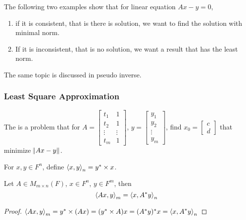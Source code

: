 The following two examples show that for linear equation $Ax - y = 0$, 
\begin{enumerate}
    \item if it is consistent, that is there is solution, we want to find the solution with minimal norm.
    \item If it is inconsistent, that is no solution, we want a result that has the least norm.
\end{enumerate}

The same topic is discussed in pseudo inverse.


\subsubsection{Least Square Approximation}

\begin{definition}
    The  is a problem that for $A = \begin{bmatrix}
        t_1 & 1 \\
        t_2 & 1 \\
        \vdots & \vdots \\
        t_m & 1
    \end{bmatrix}$,  $y = \begin{bmatrix}
        y_1\\
        y_2\\
        \vdots\\
        y_m
    \end{bmatrix}$, find $x_0 = \begin{bmatrix}
        c \\
        d
    \end{bmatrix}$ that minimize $\norm{Ax-y}$.
\end{definition}

\begin{definition}
    For $x,y \in F^n$, define $\innerproduct{x}{y}_n = y^* \times x$.
\end{definition}


\begin{theorem}
    Let $A \in M_{m \times n} (F)$, $x \in F^n$, $y\in F^m$, then
    \begin{equation}
        \innerproduct{Ax}{y}_m = \innerproduct{x}{A^* y}_n
    \end{equation}
\end{theorem}
\begin{proof}
    $\innerproduct{Ax}{y}_m = y^* \times (Ax) = (y^* \times A) x = (A^* y)^* x = \innerproduct{x}{A^* y}_n$
\end{proof}

